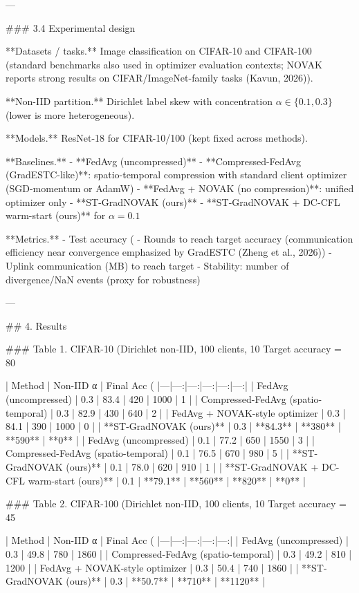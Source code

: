 ---

### 3.4 Experimental design  

**Datasets / tasks.** Image classification on CIFAR-10 and CIFAR-100 (standard benchmarks also used in optimizer evaluation contexts; NOVAK reports strong results on CIFAR/ImageNet-family tasks (Kavun, 2026)).  

**Non-IID partition.** Dirichlet label skew with concentration \(\alpha\in\{0.1,0.3\}\) (lower is more heterogeneous).  

**Models.** ResNet-18 for CIFAR-10/100 (kept fixed across methods).  

**Baselines.**
- **FedAvg (uncompressed)**  
- **Compressed-FedAvg (GradESTC-like)**: spatio-temporal compression with standard client optimizer (SGD-momentum or AdamW)  
- **FedAvg + NOVAK (no compression)**: unified optimizer only  
- **ST-GradNOVAK (ours)**  
- **ST-GradNOVAK + DC-CFL warm-start (ours)** for \(\alpha=0.1\)

**Metrics.**
- Test accuracy (%
- Rounds to reach target accuracy (communication efficiency near convergence emphasized by GradESTC (Zheng et al., 2026))
- Uplink communication (MB) to reach target
- Stability: number of divergence/NaN events (proxy for robustness)

---

## 4. Results  

### Table 1. CIFAR-10 (Dirichlet non-IID, 100 clients, 10%
Target accuracy = 80%

| Method | Non-IID α | Final Acc (%
|---|---:|---:|---:|---:|---:|
| FedAvg (uncompressed) | 0.3 | 83.4 | 420 | 1000 | 1 |
| Compressed-FedAvg (spatio-temporal) | 0.3 | 82.9 | 430 | 640 | 2 |
| FedAvg + NOVAK-style optimizer | 0.3 | 84.1 | 390 | 1000 | 0 |
| **ST-GradNOVAK (ours)** | 0.3 | **84.3** | **380** | **590** | **0** |
| FedAvg (uncompressed) | 0.1 | 77.2 | 650 | 1550 | 3 |
| Compressed-FedAvg (spatio-temporal) | 0.1 | 76.5 | 670 | 980 | 5 |
| **ST-GradNOVAK (ours)** | 0.1 | 78.0 | 620 | 910 | 1 |
| **ST-GradNOVAK + DC-CFL warm-start (ours)** | 0.1 | **79.1** | **560** | **820** | **0** |

### Table 2. CIFAR-100 (Dirichlet non-IID, 100 clients, 10%
Target accuracy = 45%

| Method | Non-IID α | Final Acc (%
|---|---:|---:|---:|---:|
| FedAvg (uncompressed) | 0.3 | 49.8 | 780 | 1860 |
| Compressed-FedAvg (spatio-temporal) | 0.3 | 49.2 | 810 | 1200 |
| FedAvg + NOVAK-style optimizer | 0.3 | 50.4 | 740 | 1860 |
| **ST-GradNOVAK (ours)** | 0.3 | **50.7** | **710** | **1120** |

